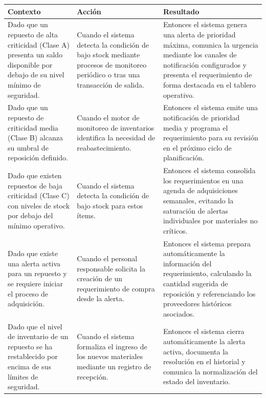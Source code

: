 \footnotesize\begin{longtable}{|p{0.28\textwidth}|p{0.32\textwidth}|p{0.34\textwidth}|}\hline
\textbf{Contexto} & \textbf{Acción} & \textbf{Resultado} \\ \hline
\parbox[t]{\linewidth}{Dado que un repuesto de alta criticidad (Clase A) presenta un saldo disponible por debajo de su nivel mínimo de seguridad.} & \parbox[t]{\linewidth}{Cuando el sistema detecta la condición de bajo stock mediante procesos de monitoreo periódico o tras una transacción de salida.} & \parbox[t]{\linewidth}{Entonces el sistema genera una alerta de prioridad máxima, comunica la urgencia mediante los canales de notificación configurados y presenta el requerimiento de forma destacada en el tablero operativo.} \\ \hline
\parbox[t]{\linewidth}{Dado que un repuesto de criticidad media (Clase B) alcanza su umbral de reposición definido.} & \parbox[t]{\linewidth}{Cuando el motor de monitoreo de inventarios identifica la necesidad de reabastecimiento.} & \parbox[t]{\linewidth}{Entonces el sistema emite una notificación de prioridad media y programa el requerimiento para su revisión en el próximo ciclo de planificación.} \\ \hline
\parbox[t]{\linewidth}{Dado que existen repuestos de baja criticidad (Clase C) con niveles de stock por debajo del mínimo operativo.} & \parbox[t]{\linewidth}{Cuando el sistema detecta la condición de bajo stock para estos ítems.} & \parbox[t]{\linewidth}{Entonces el sistema consolida los requerimientos en una agenda de adquisiciones semanales, evitando la saturación de alertas individuales por materiales no críticos.} \\ \hline
\parbox[t]{\linewidth}{Dado que existe una alerta activa para un repuesto y se requiere iniciar el proceso de adquisición.} & \parbox[t]{\linewidth}{Cuando el personal responsable solicita la creación de un requerimiento de compra desde la alerta.} & \parbox[t]{\linewidth}{Entonces el sistema prepara automáticamente la información del requerimiento, calculando la cantidad sugerida de reposición y referenciando los proveedores históricos asociados.} \\ \hline
\parbox[t]{\linewidth}{Dado que el nivel de inventario de un repuesto se ha restablecido por encima de sus límites de seguridad.} & \parbox[t]{\linewidth}{Cuando el sistema formaliza el ingreso de los nuevos materiales mediante un registro de recepción.} & \parbox[t]{\linewidth}{Entonces el sistema cierra automáticamente la alerta activa, documenta la resolución en el historial y comunica la normalización del estado del inventario.} \\ \hline
\end{longtable}\normalsize
